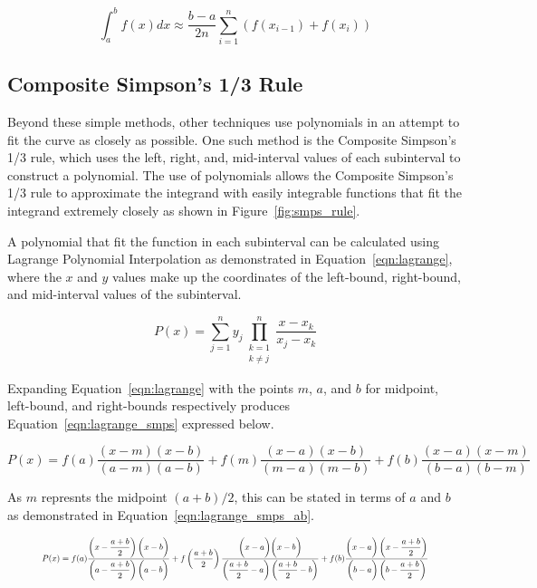 \documentclass{paper}
\begin{document}
\begin{equation}
    \label{eqn:trap_rule}
    \int_a^b f(x) dx \approx \dfrac{b - a}{2n} \sum_{i=1}^n (f(x_{i-1})+f(x_i))
\end{equation}



\subsection{Composite Simpson's 1/3 Rule}
\noindent
Beyond these simple methods, other techniques use polynomials in an attempt to fit the curve as closely as possible.
One such method is the Composite Simpson's 1/3 rule, which uses the left, right, and, mid-interval values of each subinterval to construct a polynomial. The use of polynomials allows the Composite Simpson's 1/3 rule to approximate the integrand with easily integrable functions that fit the integrand extremely closely as shown in Figure~\ref{fig:smps_rule}.



\noindent
A polynomial that fit the function in each subinterval can be calculated using Lagrange Polynomial Interpolation as demonstrated in Equation~\ref{eqn:lagrange}, where the \(x\) and \(y\) values make up the coordinates of the left-bound, right-bound, and mid-interval values of the subinterval.

\begin{equation}
    \label{eqn:lagrange}
    P(x) = \sum_{j=1}^n y_j \prod_{\substack{k = 1 \\ k \neq j}}^n \dfrac{x - x_k}{x_j - x_k}
\end{equation}

\noindent
Expanding Equation~\ref{eqn:lagrange} with the points \(m\), \(a\), and \(b\) for midpoint, left-bound, and right-bounds respectively produces Equation~\ref{eqn:lagrange_smps} expressed below.

\begin{equation}
    \label{eqn:lagrange_smps}
    P(x) = f(a) \dfrac{(x - m)(x - b)}{(a - m)(a - b)} + f(m) \dfrac{(x - a)(x - b)}{(m - a)(m - b)} + f(b) \dfrac{(x - a)(x - m)}{(b - a)(b - m)}
\end{equation}

\noindent
As \(m\) represnts the midpoint \((a + b) / 2\), this can be stated in terms of \(a\) and \(b\) as demonstrated in Equation~\ref{eqn:lagrange_smps_ab}.

\begin{equation}
    \label{eqn:lagrange_smps_ab}
    \resizebox{.9\textwidth}{!} 
    {
    $P(x) = f(a) \dfrac{\left(x - \dfrac{a+b}{2}\right)\biggl(x - b\biggr)}{\left(a - \dfrac{a+b}{2}\right)\biggl(a - b\biggr)} + f\left(\dfrac{a+b}{2}\right) \dfrac{\biggl(x - a\biggr)\biggl(x - b\biggr)}{\left(\dfrac{a+b}{2} - a\right)\left(\dfrac{a+b}{2} - b\right)} + f(b) \dfrac{\biggl(x - a\biggr)\left(x - \dfrac{a+b}{2}\right)}{\biggl(b - a\biggr)\left(b - \dfrac{a+b}{2}\right)}$
    }
\end{equation}
\end{document}
